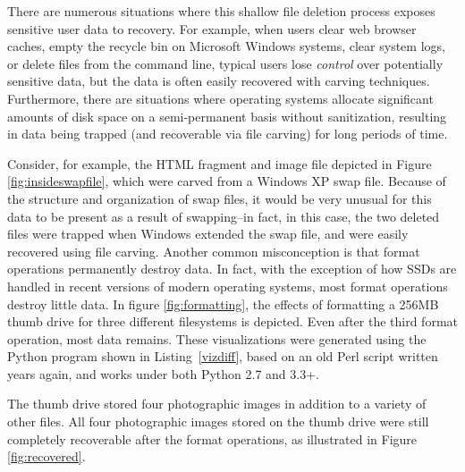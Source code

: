 There are numerous situations where this shallow file deletion process
exposes sensitive user data to recovery.  For example, when users
clear web browser caches, empty the recycle bin on Microsoft Windows
systems, clear system logs, or delete files from the command line,
typical users lose \emph{control} over potentially sensitive data, but
the data is often easily recovered with carving techniques.
Furthermore, there are situations where operating systems allocate
significant amounts of disk space on a semi-permanent basis without
sanitization, resulting in data being trapped (and recoverable via
file carving) for long periods of time.

Consider, for example, the HTML fragment and image file depicted in
Figure \ref{fig:insideswapfile}, which were carved from a Windows XP
swap file.  Because of the structure and organization of swap files,
it would be very unusual for this data to be present as a result of
swapping--in fact, in this case, the two deleted files were trapped
when Windows extended the swap file, and were easily recovered using
file carving.  Another common misconception is that format operations
permanently destroy data.  In fact, with the exception of how SSDs are
handled in recent versions of modern operating systems, most format
operations destroy little data.  In figure \ref{fig:formatting}, the
effects of formatting a 256MB thumb drive for three different
filesystems is depicted.  Even after the third format operation, most
data remains.  These visualizations were generated using the Python program
shown in Listing~\ref{vizdiff}, based on an old Perl script written years again, and works
under both Python 2.7 and 3.3+. 



The thumb drive stored four photographic images in
addition to a variety of other files.  All four photographic images
stored on the thumb drive were still completely recoverable after the
format operations, as illustrated in Figure \ref{fig:recovered}.

